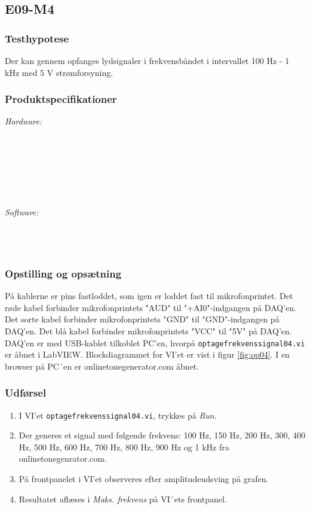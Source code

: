 \subsection{E09-M4}
		\label{subsec:E09}
		\subsubsection{Testhypotese}
		Der kan gennem \elektretto{} opfanges lydsignaler i frekvensbåndet i intervallet 100 Hz - 1 kHz med 5 V strømforsyning.
		
		\subsubsection{Produktspecifikationer}
	
			\textit{Hardware:}\\
			\elektretto\\
			\pinstre\\
			\mikrofonkabel\\
			\krympeflex\\
			\daq\\
			\daqusb\\			
			\PC
	
			\textit{Software:}\\
			\labview\\
			\daqsoft\\
			\onlineg\\

	
		\subsubsection{Opstilling og opsætning}
		På kablerne er pins fastloddet, som igen er loddet fast til mikrofonprintet. Det røde kabel forbinder mikrofonprintets "AUD"{} til "+AI0"{}-indgangen på DAQ'en. Det sorte kabel forbinder mikrofonprintets "GND"{} til "GND"{}-indgangen på DAQ'en. Det blå kabel forbinder mikrofonprintets "VCC"{} til "5V"{} på DAQ'en. DAQ'en er med USB-kablet tilkoblet PC'en, hvorpå \texttt{optagefrekvenssignal04.vi} er åbnet i LabVIEW. Blockdiagrammet for VI'et er vist i figur \ref{fig:op04}. I en browser på PC´en er onlinetonegenerator.com åbnet.       
		
	
		\subsubsection{Udførsel}
			\begin{enumerate}
				\item I VI'et \texttt{optagefrekvenssignal04.vi}, trykkes på \textit{Run}.  
				\item Der generes et signal med følgende frekvens: 100 Hz, 150 Hz, 200 Hz, 300, 400 Hz, 500 Hz, 600 Hz, 700 Hz, 800 Hz, 900 Hz og 1 kHz fra onlinetonegenrator.com.
				\item På frontpanelet i VI'et observeres efter amplitudeudsving på grafen.   
				\item Resultatet aflæses i \textit{Maks. frekvens} på VI´ets frontpanel.
			\end{enumerate}
			

